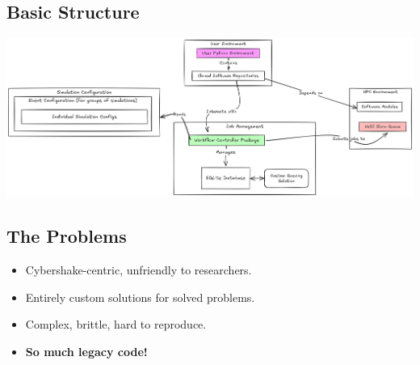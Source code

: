 \documentclass[11pt]{article}
\begin{document}
\subsection*{Basic Structure}
\label{sec:org8bfb187}
\begin{center}
\includegraphics[width=.9\linewidth]{old_workflow.png}
\end{center}
\subsection*{The Problems}
\label{sec:org36e05d3}
\begin{itemize}
\item Cybershake-centric, unfriendly to researchers.
\item Entirely custom solutions for solved problems.
\item Complex, brittle, hard to reproduce.
\item \textbf{So much legacy code!}
\end{itemize}
\end{document}
